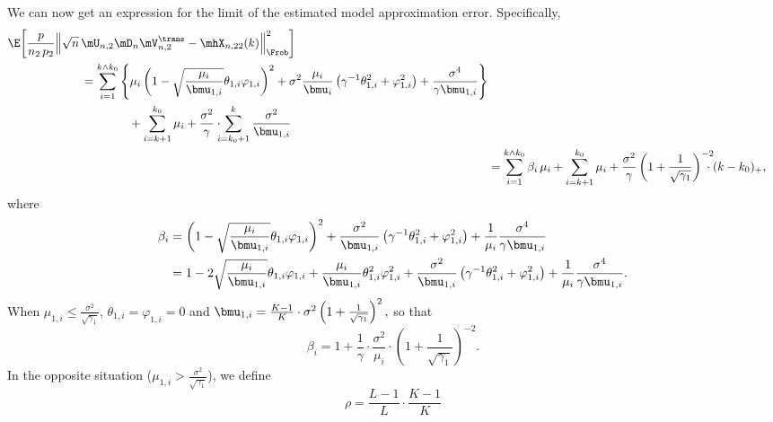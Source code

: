 We can now get an expression for the limit of the estimated model
approximation error.  Specifically,
\begin{align*}
	\begin{split}
	\E \bigg[  
		\frac{p}{n_2 \, p_2}
		\Big\|
			\sqrt{n} \, &\mU_{n,2} \mD_n \mV_{n,2}^\trans
			-
			\mhX_{n,22}(k)
		\Big\|_\Frob^2
	\bigg] \\
		&=
			\sum_{i=1}^{k \wedge k_0}
			\Bigg\{
				\mu_i 
				\left( 
					1
					-
					\sqrt{\frac{\mu_i}{\bmu_{1,i}}}
					\theta_{1,i}
					\varphi_{1,i}
				\right)^2
				+
				\sigma^2
				\frac{\mu_i}{\bmu_i}
				\left(
					\gamma^{-1} \theta_{1,i}^2
					+
					\varphi_{1,i}^2
				\right)
				+
				\frac{\sigma^4}{\gamma \bmu_{1,i}}
			\Bigg\} \\
			&\qquad\qquad+
			\sum_{i=k+1}^{k_0}
				\mu_i
			+
			\frac{\sigma^2}{\gamma}
			\cdot\!\!\!
			\sum_{i=k_0+1}^k
				\frac{\sigma^2}{\bmu_{1,i}}
	\end{split} \\
		&=
			\sum_{i=1}^{k \wedge k_0}
				\beta_i \, \mu_i
			+
			\sum_{i=k+1}^{k_0}
				\mu_i
			+
			\frac{\sigma^2}{\gamma}
			\left(
				1
				+
				\frac{1}{\sqrt{\gamma_1}}
			\right)^{-2}\!\!\!\!\!
			\cdot
			(k - k_0)_+,
\end{align*}
where
\begin{align*}
	\beta_i
		&=
			\left( 
				1
				-
				\sqrt{\frac{\mu_i}{\bmu_{1,i}}}
				\theta_{1,i}
				\varphi_{1,i}
			\right)^2
			+
			\frac{\sigma^2}{\bmu_{1,i}}
			\left(
				\gamma^{-1} \theta_{1,i}^2
				+
				\varphi_{1,i}^2
			\right)
			+
			\frac{1}{\mu_i}
			\frac{\sigma^4}{\gamma \bmu_{1,i}} \\
		&=
			1
			-
			2
			\sqrt{\frac{\mu_i}{\bmu_{1,i}}}
			\theta_{1,i}
			\varphi_{1,i}
			+
			\frac{\mu_i}{\bmu_{1,i}}
			\theta_{1,i}^2
			\varphi_{1,i}^2
			+
			\frac{\sigma^2}{\bmu_{1,i}}
			\left(
				\gamma^{-1} \theta_{1,i}^2
				+
				\varphi_{1,i}^2
			\right)
			+
			\frac{1}{\mu_i}
			\frac{\sigma^4}{\gamma \bmu_{1,i}}.
\end{align*}
When $\mu_{1,i} \leq \frac{\sigma^2}{\sqrt{\gamma_1}}$,
$\theta_{1,i} = \varphi_{1,i} = 0$ and
\(
	\bmu_{1,i} 
		= 
			\frac{K-1}{K} 
			\cdot 
			\sigma^2
			\left(
				1
				+
				\frac{1}{\sqrt{\gamma_1}}
			\right)^2,
\)
so that
\[
	\beta_i
		=
			1
			+
			\frac{1}{\gamma}
			\cdot
			\frac{\sigma^2}{\mu_i}
			\cdot
			\left(
				1
				+
				\frac{1}{\sqrt{\gamma_1}}
			\right)^{-2}.
\]
In the opposite situation
($\mu_{1,i} > \frac{\sigma^2}{\sqrt{\gamma_1}}$), we define
\[
    \rho
        =
            \frac{L-1}{L}
            \cdot
            \frac{K-1}{K}
\]
